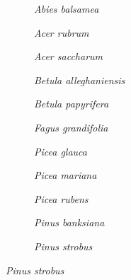 \begin{figure}[htb]
    \centering
	\begin{subfigure}{0.25\textwidth}
		
		\caption{\textit{Abies balsamea}}
		\label{fig::abibal_az}
	\end{subfigure}
	\hfil
	\begin{subfigure}{0.25\textwidth}
		
		\caption{\textit{Acer rubrum}}
		\label{fig::acerub_az}
	\end{subfigure}
	\hfil
	\begin{subfigure}{0.25\textwidth}
		
		\caption{\textit{Acer saccharum}}
		\label{fig::acesac_az}
	\end{subfigure}
	\medskip
	\begin{subfigure}{0.25\textwidth}
		
		\caption{\textit{Betula alleghaniensis}}
		\label{fig::betall_az}
	\end{subfigure}
	\hfil
	\begin{subfigure}{0.25\textwidth}
		
		\caption{\textit{Betula papyrifera}}
		\label{fig::betpap_az}
	\end{subfigure}
	\hfil
	\begin{subfigure}{0.25\textwidth}
		
		\caption{\textit{Fagus grandifolia}}
		\label{fig::faggran_az}
	\end{subfigure}
	\medskip
	\begin{subfigure}{0.25\textwidth}
		
		\caption{\textit{Picea glauca}}
		\label{fig::picgla_az}
	\end{subfigure}
	\hfil
	\begin{subfigure}{0.25\textwidth}
		
		\caption{\textit{Picea mariana}}
		\label{fig::picmar_az}
	\end{subfigure}
	\hfil
	\begin{subfigure}{0.25\textwidth}
		
		\caption{\textit{Picea rubens}}
		\label{fig::picrub_az}
	\end{subfigure}
	\medskip
	\begin{subfigure}{0.25\textwidth}
		
		\caption{\textit{Pinus banksiana}}
		\label{fig::pinban_az}
	\end{subfigure}
	\hfil
	\begin{subfigure}{0.25\textwidth}
		
		\caption{\textit{Pinus strobus}}

\end{subfigure}
\end{figure}
